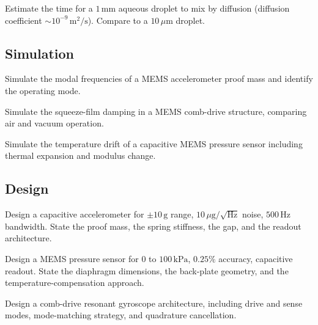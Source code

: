 \begin{exercise}
Estimate the time for a $1\,\text{mm}$ aqueous droplet to mix by diffusion (diffusion coefficient $\sim 10^{-9}\,\text{m}^2/\text{s}$). Compare to a $10\,\mu\text{m}$ droplet.
\end{exercise}

\subsection*{Simulation}

\begin{exercise}
Simulate the modal frequencies of a MEMS accelerometer proof mass and identify the operating mode.
\end{exercise}

\begin{exercise}
Simulate the squeeze-film damping in a MEMS comb-drive structure, comparing air and vacuum operation.
\end{exercise}

\begin{exercise}
Simulate the temperature drift of a capacitive MEMS pressure sensor including thermal expansion and modulus change.
\end{exercise}

\subsection*{Design}

\begin{exercise}
Design a capacitive accelerometer for $\pm 10\,\text{g}$ range, $10\,\mu\text{g}/\sqrt{\text{Hz}}$ noise, $500\,\text{Hz}$ bandwidth. State the proof mass, the spring stiffness, the gap, and the readout architecture.
\end{exercise}

\begin{exercise}
Design a MEMS pressure sensor for $0$ to $100\,\text{kPa}$, $0.25\%$ accuracy, capacitive readout. State the diaphragm dimensions, the back-plate geometry, and the temperature-compensation approach.
\end{exercise}

\begin{exercise}
Design a comb-drive resonant gyroscope architecture, including drive and sense modes, mode-matching strategy, and quadrature cancellation.
\end{exercise}

